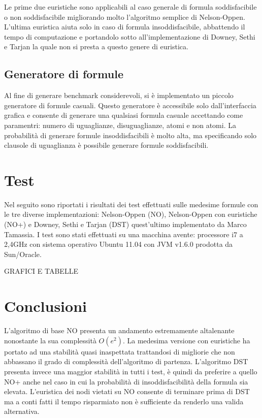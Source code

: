 \documentclass[a4paper,11pt]{article}
\begin{document}
Le prime due euristiche sono applicabili al caso generale di formula soddisfacibile o non soddisfacibile migliorando molto l'algoritmo semplice di Nelson-Oppen.
L'ultima euristica aiuta solo in caso di formula insoddisfacibile, abbattendo il tempo di computazione e portandolo sotto all'implementazione di Downey, Sethi e Tarjan la quale non si presta a questo genere di euristica.
\subsection{Generatore di formule}
Al fine di generare benchmark considerevoli, si è implementato un piccolo generatore di formule casuali.
Questo generatore è accessibile solo dall'interfaccia grafica e consente di generare una qualsiasi formula casuale accettando come paramentri: numero di uguaglianze, disuguaglianze, atomi e non atomi.
La probabilità di generare formule insoddisfacibili è molto alta, ma specificando solo clausole di uguaglianza è possibile generare formule soddisfacibili.
\section{Test}
Nel seguito sono riportati i risultati dei test effettuati sulle medesime formule con le tre diverse implementazioni: Nelson-Oppen (NO), Nelson-Oppen con euristiche (NO+) e Downey, Sethi e Tarjan (DST) quest'ultimo implementato da Marco Tamassia.
I test sono stati effettuati su una macchina avente: processore i7 a 2,4GHz con sistema operativo Ubuntu 11.04 con JVM v1.6.0 prodotta da Sun/Oracle.

GRAFICI E TABELLE

\section{Conclusioni}
L'algoritmo di base NO presenta un andamento estremamente altalenante nonostante la sua complessità $O(e^2)$.
La medesima versione con euristiche ha portato ad una stabilità quasi inaspettata trattandosi di migliorie che non abbassano il grado di complessità dell'algoritmo di partenza.
L'algoritmo DST presenta invece una maggior stabilità in tutti i test, è quindi da preferire a quello NO+ anche nel caso in cui la probabilità di insoddisfacibilità della formula sia elevata.
L'euristica dei nodi vietati su NO consente di terminare prima di DST ma a conti fatti il tempo risparmiato non è sufficiente da renderlo una valida alternativa.
\end{document}
